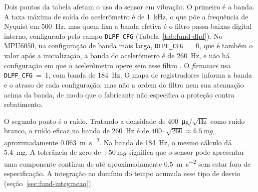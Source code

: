 Dois pontos da tabela afetam o uso do sensor em vibração. O primeiro é a banda. A taxa máxima de saída do acelerômetro é de
\SI{1}{\kilo\hertz}, o que põe a frequência de Nyquist em \SI{500}{\hertz}, mas quem fixa a banda efetiva é o filtro
passa-baixas digital interno, configurado pelo campo \texttt{DLPF\_CFG} (Tabela~\ref{tab:fund-dlpf}). No MPU6050, na configuração de banda
mais larga, \texttt{DLPF\_CFG}~=~0, que é também o valor após a inicialização, a banda do acelerômetro é de \SI{260}{\hertz},
e não há configuração em que o acelerômetro opere sem esse filtro \cite{invensense2012rm}. O \emph{firmware} usa
\texttt{DLPF\_CFG}~=~1, com banda de \SI{184}{\hertz}. O mapa de registradores informa a banda e o atraso de cada configuração,
mas não a ordem do filtro nem sua atenuação acima da banda, de modo que o fabricante não especifica a proteção contra
rebatimento.

\begin{table}[!htb]
\end{table}

O segundo ponto é o ruído. Tratando a densidade de \SI{400}{\micro g}/$\sqrt{\si{\hertz}}$ como ruído branco, o ruído eficaz na
banda de \SI{260}{\hertz} é de $400 \cdot \sqrt{260} \approx \SI{6,5}{\milli g}$, aproximadamente
\SI{0,063}{\meter\per\second\squared}. Na banda de \SI{184}{\hertz}, o mesmo cálculo dá \SI{5,4}{\milli g}. A tolerância de zero
de $\pm\SI{50}{\milli g}$ significa que o sensor pode apresentar uma componente contínua de até aproximadamente
\SI{0,5}{\meter\per\second\squared} sem estar fora de especificação. A integração no domínio do tempo acumula esse tipo de desvio
(seção~\ref{sec:fund-integracao}).

